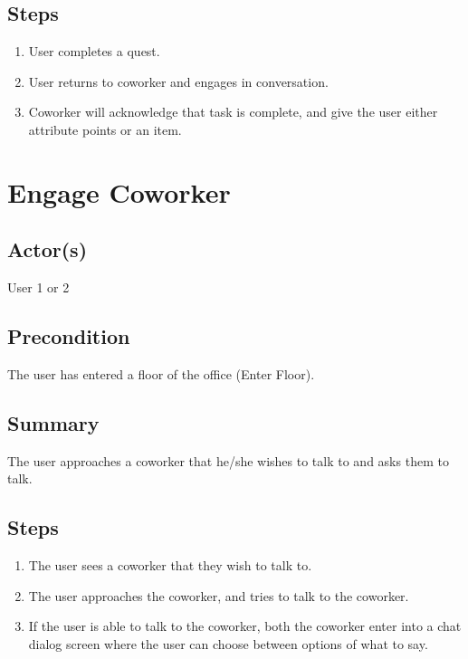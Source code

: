 \documentclass[12pt]{article}
\begin{document}
			\subsection{Steps}
			\begin{enumerate}
			\item User completes a quest.
			\item User returns to coworker and engages in conversation.
			\item Coworker will acknowledge that task is complete, and give the user either attribute points or an item.
			
			\end{enumerate}



\section{Engage Coworker}
	

		\subsection{Actor(s)}
			User 1 or 2
			

		\subsection{Precondition}
				The user has entered a floor of the office (Enter Floor).
			
	
		\subsection{Summary}
			The user approaches a coworker that he/she wishes to talk to and asks them to talk.
			\subsection{Steps}
			\begin{enumerate}
			\item The user sees a coworker that they wish to talk to.
			\item The user approaches the coworker, and tries to talk to the coworker. 
			\item If the user is able to talk to the coworker, both the coworker enter into a chat dialog screen where the user can choose between options of what to say. 
			
			\end{enumerate}
\end{document}
